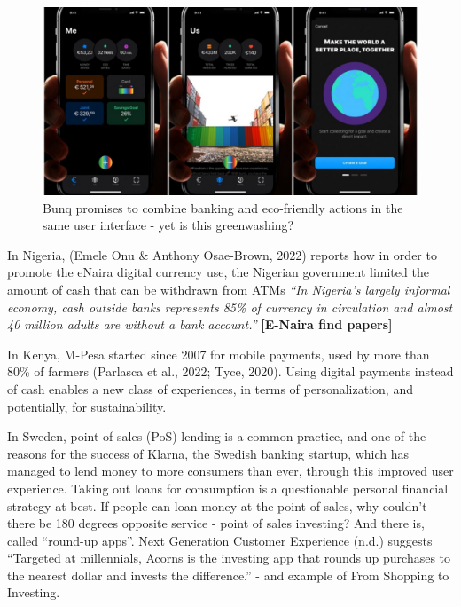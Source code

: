 \documentclass[
  letterpaper,
  DIV=11,
  numbers=noendperiod]{scrartcl}
\begin{document}
\begin{figure}[H]

{\centering \includegraphics[width=1\linewidth,height=\textheight,keepaspectratio]{./images/finance/bunq.jpg}

}

\caption{Bunq promises to combine banking and eco-friendly actions in
the same user interface - yet is this greenwashing?}

\end{figure}%

In Nigeria, (Emele Onu \& Anthony Osae-Brown, 2022) reports how in order
to promote the eNaira digital currency use, the Nigerian government
limited the amount of cash that can be withdrawn from ATMs \emph{``In
Nigeria's largely informal economy, cash outside banks represents 85\%
of currency in circulation and almost 40 million adults are without a
bank account.''} \textbf{{[}E-Naira find papers{]}}

In Kenya, M-Pesa started since 2007 for mobile payments, used by more
than 80\% of farmers (Parlasca et al., 2022; Tyce, 2020). Using digital
payments instead of cash enables a new class of experiences, in terms of
personalization, and potentially, for sustainability.

In Sweden, point of sales (PoS) lending is a common practice, and one of
the reasons for the success of Klarna, the Swedish banking startup,
which has managed to lend money to more consumers than ever, through
this improved user experience. Taking out loans for consumption is a
questionable personal financial strategy at best. If people can loan
money at the point of sales, why couldn't there be 180 degrees opposite
service - point of sales investing? And there is, called ``round-up
apps''. Next Generation Customer Experience (n.d.) suggests ``Targeted
at millennials, Acorns is the investing app that rounds up purchases to
the nearest dollar and invests the difference.'' - and example of From
Shopping to Investing.
\end{document}
